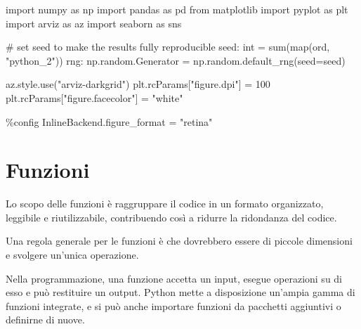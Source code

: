 \documentclass[
  letterpaper,
  krantz2]{{[}./krantz{]}}
\newenvironment{Shaded}{\begin{snugshade}}{\end{snugshade}}
\newcommand{\BuiltInTok}[1]{\textcolor[rgb]{0.00,0.23,0.31}{#1}}
\newcommand{\CommentTok}[1]{\textcolor[rgb]{0.37,0.37,0.37}{#1}}
\newcommand{\DecValTok}[1]{\textcolor[rgb]{0.68,0.00,0.00}{#1}}
\newcommand{\ImportTok}[1]{\textcolor[rgb]{0.00,0.46,0.62}{#1}}
\newcommand{\NormalTok}[1]{\textcolor[rgb]{0.00,0.23,0.31}{#1}}
\newcommand{\OperatorTok}[1]{\textcolor[rgb]{0.37,0.37,0.37}{#1}}
\newcommand{\StringTok}[1]{\textcolor[rgb]{0.13,0.47,0.30}{#1}}
\begin{document}
\begin{Shaded}
\begin{Highlighting}[]
\ImportTok{import}\NormalTok{ numpy }\ImportTok{as}\NormalTok{ np}
\ImportTok{import}\NormalTok{ pandas }\ImportTok{as}\NormalTok{ pd}
\ImportTok{from}\NormalTok{ matplotlib }\ImportTok{import}\NormalTok{ pyplot }\ImportTok{as}\NormalTok{ plt}
\ImportTok{import}\NormalTok{ arviz }\ImportTok{as}\NormalTok{ az}
\ImportTok{import}\NormalTok{ seaborn }\ImportTok{as}\NormalTok{ sns}
\end{Highlighting}
\end{Shaded}

\begin{Shaded}
\begin{Highlighting}[]
\CommentTok{\# set seed to make the results fully reproducible}
\NormalTok{seed: }\BuiltInTok{int} \OperatorTok{=} \BuiltInTok{sum}\NormalTok{(}\BuiltInTok{map}\NormalTok{(}\BuiltInTok{ord}\NormalTok{, }\StringTok{"python\_2"}\NormalTok{))}
\NormalTok{rng: np.random.Generator }\OperatorTok{=}\NormalTok{ np.random.default\_rng(seed}\OperatorTok{=}\NormalTok{seed)}

\NormalTok{az.style.use(}\StringTok{"arviz{-}darkgrid"}\NormalTok{)}
\NormalTok{plt.rcParams[}\StringTok{"figure.dpi"}\NormalTok{] }\OperatorTok{=} \DecValTok{100}
\NormalTok{plt.rcParams[}\StringTok{"figure.facecolor"}\NormalTok{] }\OperatorTok{=} \StringTok{"white"}

\OperatorTok{\%}\NormalTok{config InlineBackend.figure\_format }\OperatorTok{=} \StringTok{"retina"}
\end{Highlighting}
\end{Shaded}

\section{Funzioni}\label{funzioni}

Lo scopo delle funzioni è raggruppare il codice in un formato
organizzato, leggibile e riutilizzabile, contribuendo così a ridurre la
ridondanza del codice.

Una regola generale per le funzioni è che dovrebbero essere di piccole
dimensioni e svolgere un'unica operazione.

Nella programmazione, una funzione accetta un input, esegue operazioni
su di esso e può restituire un output. Python mette a disposizione
un'ampia gamma di funzioni integrate, e si può anche importare funzioni
da pacchetti aggiuntivi o definirne di nuove.
\end{document}
